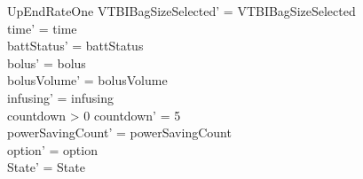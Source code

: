 \begin{schema}{UpEndRateOne}
	VTBIBagSizeSelected' = VTBIBagSizeSelected\\
	time' = time\\
	battStatus' = battStatus\\
	bolus' = bolus\\
	bolusVolume' = bolusVolume\\
	infusing' = infusing\\
	countdown > 0 \land countdown' = 5\\
	powerSavingCount' = powerSavingCount\\ 
	option' = option\\
	State' = State\\
\end{schema}

